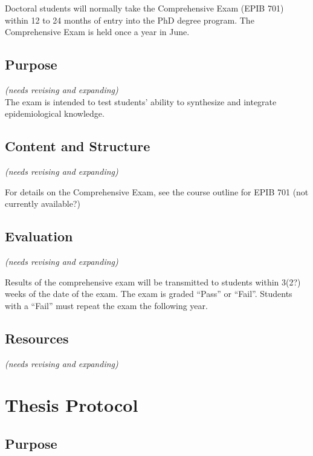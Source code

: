 \documentclass[
  openany]{book}
\begin{document}
Doctoral students will normally take the Comprehensive Exam (EPIB 701) within 12 to 24 months of entry into the PhD degree program. The Comprehensive Exam is held once a year in June.

\hypertarget{purpose}{%
\section{Purpose}\label{purpose}}

\emph{(needs revising and expanding)}\\
The exam is intended to test students' ability to synthesize and integrate epidemiological knowledge.

\hypertarget{content-and-structure}{%
\section{Content and Structure}\label{content-and-structure}}

\emph{(needs revising and expanding)}

For details on the Comprehensive Exam, see the course outline for EPIB 701 (not currently available?)

\hypertarget{evaluation}{%
\section{Evaluation}\label{evaluation}}

\emph{(needs revising and expanding)}

Results of the comprehensive exam will be transmitted to students within 3(2?) weeks of the date of the exam. The exam is graded ``Pass'' or ``Fail''. Students with a ``Fail'' must repeat the exam the following year.

\hypertarget{resources}{%
\section{Resources}\label{resources}}

\emph{(needs revising and expanding)}

\hypertarget{thesis-protocol}{%
\chapter{Thesis Protocol}\label{thesis-protocol}}

\hypertarget{purpose-1}{%
\section{Purpose}\label{purpose-1}}
\end{document}
